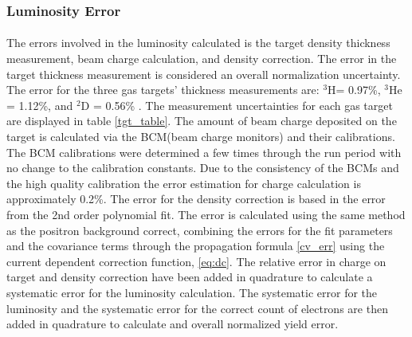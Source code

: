 \subsubsection{Luminosity Error}
\paragraph{}The errors involved in the luminosity calculated is the target density thickness measurement, beam charge calculation, and density correction. The error in the target thickness measurement is considered an overall normalization uncertainty. The error for the three gas targets' thickness measurements are: $^3$H= 0.97\%, $^3$He = 1.12\%, and $^2$D = 0.56\% \cite{HATT_eng}. The measurement uncertainties for each gas target are displayed in table \ref{tgt_table}. The amount of beam charge deposited on the target is calculated via the BCM(beam charge monitors) and their calibrations. The BCM calibrations were determined a few times through the run period with no change to the calibration constants. Due to the consistency of the BCMs and the high quality calibration the  error estimation for charge calculation is approximately 0.2\%. The error for the density correction is based in the error from the 2nd order polynomial fit. The error is calculated using the same method as the positron background correct, combining the errors for the fit parameters and the covariance terms through the propagation formula \ref{cv_err} using the current dependent correction function, \ref{eq:dc}. The relative error in charge on target and density correction have been added in quadrature to calculate a systematic error for the luminosity calculation. The systematic error for the luminosity and the systematic error for the correct count of electrons are then added in quadrature to calculate and overall normalized yield error.  
